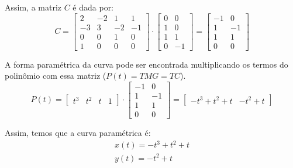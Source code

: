 \documentclass[12pt]{article}
\begin{document}
Assim, a matriz $C$ é dada por:
\begin{equation*}
    C = 
    \begin{bmatrix}
    2 & -2 & 1 & 1 \\
    -3 & 3 & -2 & -1\\
    0 & 0 & 1 & 0\\
    1 & 0 & 0 & 0
    \end{bmatrix}
    \cdot
    \begin{bmatrix}
    0 & 0 \\
    1 & 0 \\
    1 & 1 \\
    0 & -1
    \end{bmatrix}
    =
    \begin{bmatrix}
    -1 & 0 \\
    1 & -1 \\
    1 & 1 \\
    0 & 0
    \end{bmatrix}
\end{equation*}

A forma paramétrica da curva pode ser encontrada multiplicando os termos do polinômio com essa matriz ($P(t) = TMG = TC$).
\begin{equation*}
    P(t)=
    \begin{bmatrix}
    t^3 & t^2 & t & 1
    \end{bmatrix}
    \cdot
    \begin{bmatrix}
    -1 & 0 \\
    1 & -1 \\
    1 & 1 \\
    0 & 0
    \end{bmatrix}
    =
    \begin{bmatrix}
    -t^3 + t^2 + t & -t^2+t 
    \end{bmatrix}
\end{equation*}

Assim, temos que a curva paramétrica é:
\begin{gather*}
    x(t) = -t^3 + t^2 + t\\
    y(t) = -t^2 + t
\end{gather*}
\end{document}
